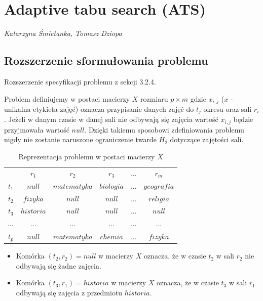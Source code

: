 
\section{Adaptive tabu search (ATS)}
\textit{Katarzyna Śmietanka, Tomasz Dziopa}
\subsection{Rozszerzenie sformułowania problemu }
Rozszerzenie specyfikacji problemu z sekcji 3.2.4.
\par Problem definiujemy w postaci macierzy ${X}$  rozmiaru ${p \times m}$ gdzie ${x_{i,j}}$ ($x$ - unikalna etykieta zajęć) oznacza przypisanie danych zajęć do ${t_{j}}$ okresu oraz sali ${r_{i}}$. Jeżeli w danym czasie w danej sali nie odbywają się zajęcia wartość ${x_{i,j}}$ będzie przyjmowała wartość ${null}$. Dzięki takiemu sposobowi zdefiniowania problemu nigdy nie zostanie naruszone ograniczenie twarde ${H_{2}}$ dotyczące zajętości sali.

\begin{table}[H]
\begin{center}

\begin{tabular}{ r|c|c|c|c|c| }
\multicolumn{1}{r}{}
 &  \multicolumn{1}{c}{$r_{1}$}
 & \multicolumn{1}{c}{$r_{2}$} 
 & \multicolumn{1}{c}{$r_{3}$} 
 & \multicolumn{1}{c}{$...$} 
 & \multicolumn{1}{c}{$r_{m}$} 
 \\
\cline{2-6}
$t_{1}$ & $null$ & $matematyka$ & $biologia$ & $...$ & $geografia$ \\
\cline{2-6}
$t_{2}$ & $fizyka$ & $null$  & $null$ & $...$ & $religia$\\
\cline{2-6}
$t_{3}$ & $historia$ & $null$  & $null$ & $...$ & $null$\\
\cline{2-6}
$...$ & $...$ & $...$ & $...$ & $...$ & $...$ \\
\cline{2-6}
$t_{p}$ & $null$ & $matematyka$ & $chemia$ & $...$ & $fizyka$ \\
\cline{2-6}
\end{tabular}
\end{center}
\caption {Reprezentacja problemu w postaci macierzy $X$}
\end{table} 
\begin{itemize}
 \item Komórka $(t_{2}, r_{2}) = null$ w macierzy $X$ oznacza, że w czasie $t_{2}$ w sali $r_{2}$ nie odbywają się żadne zajęcia.
 \item Komórka $(t_{3}, r_{1}) = historia$ w macierzy $X$ oznacza, że w czasie $t_{3}$ w sali $r_{1}$ odbywają się zajęcia z przedmiotu $historia$.
\end{itemize}


